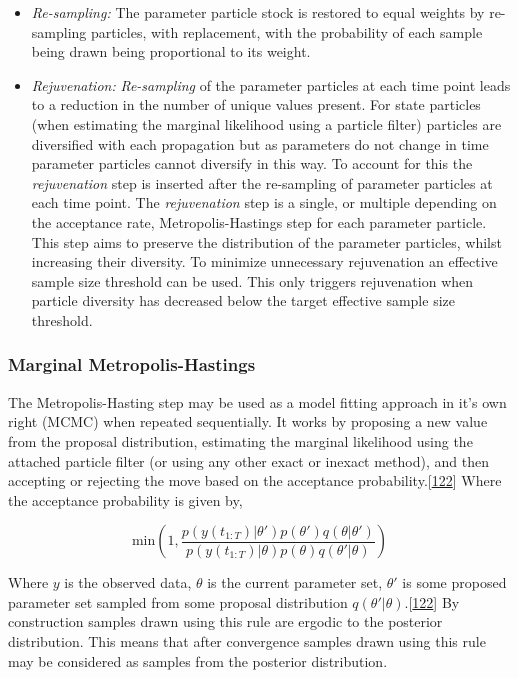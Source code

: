\documentclass[11pt,twoside]{bristolthesis}
\begin{document}
  \begin{itemize}
  \item
    \emph{Re-sampling:} The parameter particle stock is restored to equal weights by re-sampling particles, with replacement, with the probability of each sample being drawn being proportional to its weight.
  \item
    \emph{Rejuvenation:} \emph{Re-sampling} of the parameter particles at each time point leads to a reduction in the number of unique values present. For state particles (when estimating the marginal likelihood using a particle filter) particles are diversified with each propagation but as parameters do not change in time parameter particles cannot diversify in this way. To account for this the \emph{rejuvenation} step is inserted after the re-sampling of parameter particles at each time point. The \emph{rejuvenation} step is a single, or multiple depending on the acceptance rate, Metropolis-Hastings step for each parameter particle. This step aims to preserve the distribution of the parameter particles, whilst increasing their diversity. To minimize unnecessary rejuvenation an effective sample size threshold can be used. This only triggers rejuvenation when particle diversity has decreased below the target effective sample size threshold.
  \end{itemize}
  \hypertarget{marginal-metropolis-hastings}{%
  \subsubsection{Marginal Metropolis-Hastings}\label{marginal-metropolis-hastings}}
  
  The Metropolis-Hasting step may be used as a model fitting approach in it's own right (MCMC) when repeated sequentially. It works by proposing a new value from the proposal distribution, estimating the marginal likelihood using the attached particle filter (or using any other exact or inexact method), and then accepting or rejecting the move based on the acceptance probability.{[}\protect\hyperlink{ref-Murray2015}{122}{]} Where the acceptance probability is given by,
  
  \[ \text{min} \left(1,  \frac{p(y(t_{1:T}) |\theta')p(\theta')q(\theta | \theta')}{p(y(t_{1:T}) |\theta)p(\theta)q(\theta' | \theta)}\right) \]
  
  Where \(y\) is the observed data, \(\theta\) is the current parameter set, \(\theta'\) is some proposed parameter set sampled from some proposal distribution \(q(\theta' | \theta)\).{[}\protect\hyperlink{ref-Murray2015}{122}{]} By construction samples drawn using this rule are ergodic to the posterior distribution. This means that after convergence samples drawn using this rule may be considered as samples from the posterior distribution.
  
\end{document}
